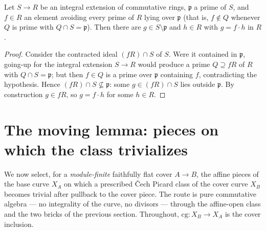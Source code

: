 \begin{lemma}
  \label{pa-lem:algebraic_tube}
  \leanok

  Let \(S \to R\) be an integral extension of commutative rings, \(\mathfrak p\) a prime of \(S\),
  and \(f \in R\) an element avoiding every prime of \(R\) lying over \(\mathfrak p\) (that is,
  \(f \notin Q\) whenever \(Q\) is prime with \(Q \cap S = \mathfrak p\)). Then there are \(g \in S
  \setminus \mathfrak p\) and \(h \in R\) with \(g = f \cdot h\) in \(R\).
\end{lemma}
\begin{proof}
  \leanok
  Consider the contracted ideal \((fR) \cap S\) of \(S\). Were it contained in \(\mathfrak p\),
  going-up for the integral extension \(S \to R\) would produce a prime \(Q \supseteq fR\) of \(R\)
  with \(Q \cap S = \mathfrak p\); but then \(f \in Q\) is a prime over \(\mathfrak p\) containing
  \(f\), contradicting the hypothesis. Hence \((fR) \cap S \not\subseteq \mathfrak p\): some
  \(g \in (fR) \cap S\) lies outside \(\mathfrak p\). By construction \(g \in fR\), so \(g = f \cdot
  h\) for some \(h \in R\).
\end{proof}

\section{The moving lemma: pieces on which the class trivializes}
\label{pa-sec:effectivityMoving}

We now select, for a \emph{module-finite} faithfully flat cover \(A \to B\), the affine pieces of the
base curve \(X_A\) on which a prescribed \v Cech Picard class of the cover curve \(X_B\) becomes
trivial after pullback to the cover piece. The route is pure commutative algebra --- no integrality
of the curve, no divisors --- through the affine-open class and the two bricks of the previous
section. Throughout, \(\mathrm{cg} \colon X_B \to X_A\) is the cover inclusion.

